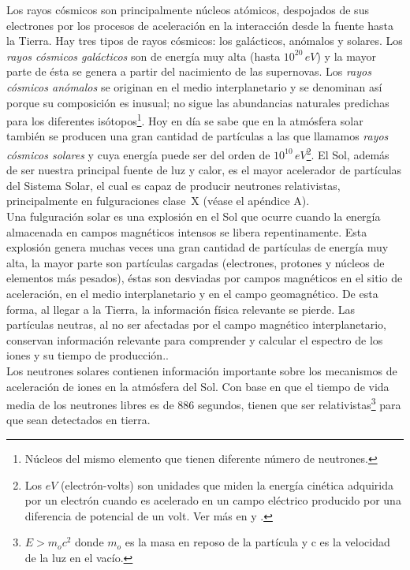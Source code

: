 Los rayos cósmicos son principalmente núcleos atómicos, despojados de sus electrones por los procesos de aceleración en la interacción desde la fuente hasta la Tierra. Hay tres tipos de rayos cósmicos: los galácticos, anómalos y solares. Los \emph{rayos cósmicos galácticos} son de  energía muy alta (hasta $10^{20}\, eV$) y la mayor parte de ésta se genera a partir del nacimiento de las supernovas. Los \emph{rayos cósmicos anómalos} se originan en el medio interplanetario y se denominan así porque su composición es inusual; no sigue las abundancias naturales predichas para los diferentes isótopos\footnote{Núcleos del mismo elemento que tienen diferente número de neutrones.}\cite{cosmicray}. Hoy en día se sabe que en la atmósfera solar también se producen una gran cantidad de partículas a las que llamamos \emph{rayos cósmicos solares} y cuya energía puede ser del orden de $10^{10}$\,$eV$\footnote{Los $eV$ (electrón-volts) son unidades que miden la energía cinética adquirida por un electrón cuando es acelerado en un campo eléctrico producido por una diferencia de potencial de un volt. Ver más en \cite{mensajeros} y \cite{brunorossi}.}\cite{TNS}. El Sol, además de ser nuestra principal fuente de luz y calor, es el mayor acelerador de partículas del Sistema Solar, el cual es capaz de producir neutrones relativistas, principalmente en fulguraciones clase~X (véase el apéndice A).\\


Una fulguración solar es una explosión en el Sol que ocurre cuando la energía almacenada en campos magnéticos intensos se libera repentinamente. Esta explosión genera muchas veces una gran cantidad de partículas de energía muy alta, la mayor parte son partículas cargadas (electrones, protones y núcleos de elementos más pesados), éstas son desviadas por campos magnéticos en el sitio de aceleración, en el medio interplanetario y en el campo geomagnético. De esta forma, al llegar a la Tierra, la información física relevante se pierde. Las partículas neutras, al no ser afectadas por el campo magnético interplanetario, conservan información relevante para comprender  y calcular el espectro de los iones y su tiempo de producción.\cite{TNS}.\\
 
Los neutrones solares contienen información importante sobre los mecanismos de aceleración de iones en la atmósfera del Sol\cite{watanab}. Con base en que el tiempo de vida media de los neutrones libres es de 886 segundos, tienen que ser relativistas\footnote{$E > m_{o} c^2$ donde $m_{o}$ es la masa en reposo de la partícula y c es la velocidad de la luz en el vacío.} para que sean detectados en tierra.\\
 
